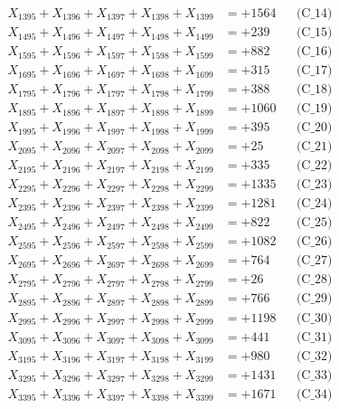 \documentclass[a4paper,10pt]{article}
\begin{document}
{\begin{align}
X_{1395} + X_{1396} + X_{1397} + X_{1398} + X_{1399} &= +1564 && \text{(C\_14)} \\
X_{1495} + X_{1496} + X_{1497} + X_{1498} + X_{1499} &= +239 && \text{(C\_15)} \\
\allowbreak
X_{1595} + X_{1596} + X_{1597} + X_{1598} + X_{1599} &= +882 && \text{(C\_16)} \\
X_{1695} + X_{1696} + X_{1697} + X_{1698} + X_{1699} &= +315 && \text{(C\_17)} \\
X_{1795} + X_{1796} + X_{1797} + X_{1798} + X_{1799} &= +388 && \text{(C\_18)} \\
X_{1895} + X_{1896} + X_{1897} + X_{1898} + X_{1899} &= +1060 && \text{(C\_19)} \\
X_{1995} + X_{1996} + X_{1997} + X_{1998} + X_{1999} &= +395 && \text{(C\_20)} \\
\allowbreak
X_{2095} + X_{2096} + X_{2097} + X_{2098} + X_{2099} &= +25 && \text{(C\_21)} \\
X_{2195} + X_{2196} + X_{2197} + X_{2198} + X_{2199} &= +335 && \text{(C\_22)} \\
X_{2295} + X_{2296} + X_{2297} + X_{2298} + X_{2299} &= +1335 && \text{(C\_23)} \\
X_{2395} + X_{2396} + X_{2397} + X_{2398} + X_{2399} &= +1281 && \text{(C\_24)} \\
X_{2495} + X_{2496} + X_{2497} + X_{2498} + X_{2499} &= +822 && \text{(C\_25)} \\
\allowbreak
X_{2595} + X_{2596} + X_{2597} + X_{2598} + X_{2599} &= +1082 && \text{(C\_26)} \\
X_{2695} + X_{2696} + X_{2697} + X_{2698} + X_{2699} &= +764 && \text{(C\_27)} \\
X_{2795} + X_{2796} + X_{2797} + X_{2798} + X_{2799} &= +26 && \text{(C\_28)} \\
X_{2895} + X_{2896} + X_{2897} + X_{2898} + X_{2899} &= +766 && \text{(C\_29)} \\
X_{2995} + X_{2996} + X_{2997} + X_{2998} + X_{2999} &= +1198 && \text{(C\_30)} \\
\allowbreak
X_{3095} + X_{3096} + X_{3097} + X_{3098} + X_{3099} &= +441 && \text{(C\_31)} \\
X_{3195} + X_{3196} + X_{3197} + X_{3198} + X_{3199} &= +980 && \text{(C\_32)} \\
X_{3295} + X_{3296} + X_{3297} + X_{3298} + X_{3299} &= +1431 && \text{(C\_33)} \\
X_{3395} + X_{3396} + X_{3397} + X_{3398} + X_{3399} &= +1671 && \text{(C\_34)} \\

\end{align}}
\end{document}
